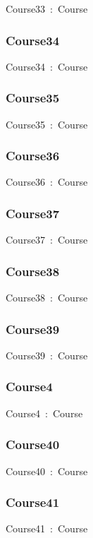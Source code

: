 \documentclass{article}
\begin{document}
Course33~:~Course

\subsubsection*{Course34}

Course34~:~Course

\subsubsection*{Course35}

Course35~:~Course

\subsubsection*{Course36}

Course36~:~Course

\subsubsection*{Course37}

Course37~:~Course

\subsubsection*{Course38}

Course38~:~Course

\subsubsection*{Course39}

Course39~:~Course

\subsubsection*{Course4}

Course4~:~Course

\subsubsection*{Course40}

Course40~:~Course

\subsubsection*{Course41}

Course41~:~Course
\end{document}
